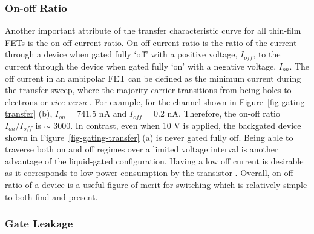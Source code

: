 \documentclass[
  a4paper,
]{scrbook}
\begin{document}
\hypertarget{on-off-ratio}{%
\subsubsection*{On-off Ratio}\label{on-off-ratio}}

Another important attribute of the transfer characteristic curve for all
thin-film FETs is the on-off current ratio. On-off current ratio is the
ratio of the current through a device when gated fully `off' with a
positive voltage, \(I_{off}\), to the current through the device when
gated fully `on' with a negative voltage, \(I_{on}\). The off current in
an ambipolar FET can be defined as the minimum current during the
transfer sweep, where the majority carrier transitions from being holes
to electrons or \emph{vice versa} \autocite{Petti2016,Zheng2017}. For
example, for the channel shown in Figure~\ref{fig-gating-transfer} (b),
\(I_{on} = 741.5\) nA and \(I_{off} = 0.2\) nA. Therefore, the on-off
ratio \(I_{on}/I_{off}\) is \(\sim\) 3000. In contrast, even when 10 V
is applied, the backgated device shown in
Figure~\ref{fig-gating-transfer} (a) is never gated fully off. Being
able to traverse both on and off regimes over a limited voltage interval
is another advantage of the liquid-gated configuration. Having a low off
current is desirable as it corresponds to low power consumption by the
transistor \autocite{Rouhi2010}. Overall, on-off ratio of a device is a
useful figure of merit for switching which is relatively simple to both
find and present.

\hypertarget{gate-leakage}{%
\subsubsection*{Gate Leakage}\label{gate-leakage}}
\end{document}

